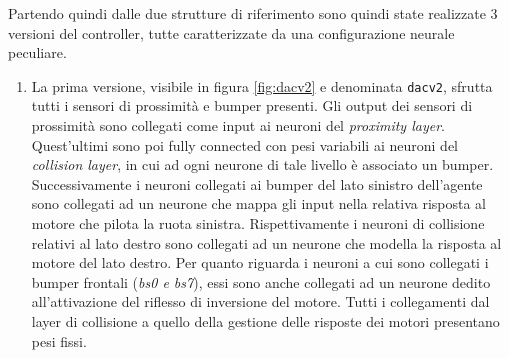 Partendo quindi dalle due strutture di riferimento sono quindi state realizzate 3 versioni del controller, tutte caratterizzate da una configurazione neurale peculiare.\label{marker:dacmodels} 
\begin{enumerate}
    \item La prima versione, visibile in figura \ref{fig:dacv2} e denominata \texttt{dacv2}, sfrutta tutti i sensori di prossimità e bumper presenti. Gli output dei sensori di prossimità sono collegati come input ai neuroni del \textit{proximity layer}. Quest'ultimi sono poi fully connected con pesi variabili ai neuroni del \textit{collision layer}, in cui ad ogni neurone di tale livello è associato un bumper. Successivamente i neuroni collegati ai bumper del lato sinistro dell'agente sono collegati ad un neurone che mappa gli input nella relativa risposta al motore che pilota la ruota sinistra. Rispettivamente i neuroni di collisione relativi al lato destro sono collegati ad un neurone che modella la risposta al motore del lato destro. Per quanto riguarda i neuroni a cui sono collegati i bumper frontali (\textit{bs0 e bs7}), essi sono anche collegati ad un neurone dedito all'attivazione del riflesso di inversione del motore. Tutti i collegamenti dal layer di collisione a quello della gestione delle risposte dei motori presentano pesi fissi.
    

\end{enumerate}
